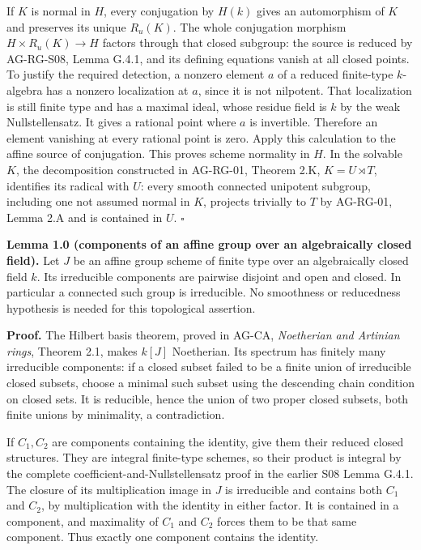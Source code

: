 \documentclass[11pt,a4paper,openany]{report}
\begin{document}
If \(K\) is normal in \(H\), every conjugation by \(H(k)\) gives an automorphism of \(K\) and preserves its unique \(R_u(K)\). The whole conjugation morphism \(H\times R_u(K)\to H\) factors through that closed subgroup: the source is reduced by AG-RG-S08, Lemma G.4.1, and its defining equations vanish at all closed points. To justify the required detection, a nonzero element \(a\) of a reduced finite-type \(k\)-algebra has a nonzero localization at \(a\), since it is not nilpotent. That localization is still finite type and has a maximal ideal, whose residue field is \(k\) by the weak Nullstellensatz. It gives a rational point where \(a\) is invertible. Therefore an element vanishing at every rational point is zero. Apply this calculation to the affine source of conjugation. This proves scheme normality in \(H\). In the solvable \(K\), the decomposition constructed in AG-RG-01, Theorem 2.K, \(K=U\rtimes T\), identifies its radical with \(U\): every smooth connected unipotent subgroup, including one not assumed normal in \(K\), projects trivially to \(T\) by AG-RG-01, Lemma 2.A and is contained in \(U\). \(\square\)

\textbf{Lemma 1.0 (components of an affine group over an algebraically closed field).} Let \(J\) be an affine group scheme of finite type over an algebraically closed field \(k\). Its irreducible components are pairwise disjoint and open and closed. In particular a connected such group is irreducible. No smoothness or reducedness hypothesis is needed for this topological assertion.

\textbf{Proof.} The Hilbert basis theorem, proved in AG-CA, \emph{Noetherian and Artinian rings}, Theorem 2.1, makes \(k[J]\) Noetherian. Its spectrum has finitely many irreducible components: if a closed subset failed to be a finite union of irreducible closed subsets, choose a minimal such subset using the descending chain condition on closed sets. It is reducible, hence the union of two proper closed subsets, both finite unions by minimality, a contradiction.

If \(C_1,C_2\) are components containing the identity, give them their reduced closed structures. They are integral finite-type schemes, so their product is integral by the complete coefficient-and-Nullstellensatz proof in the earlier S08 Lemma G.4.1. The closure of its multiplication image in \(J\) is irreducible and contains both \(C_1\) and \(C_2\), by multiplication with the identity in either factor. It is contained in a component, and maximality of \(C_1\) and \(C_2\) forces them to be that same component. Thus exactly one component contains the identity.
\end{document}
